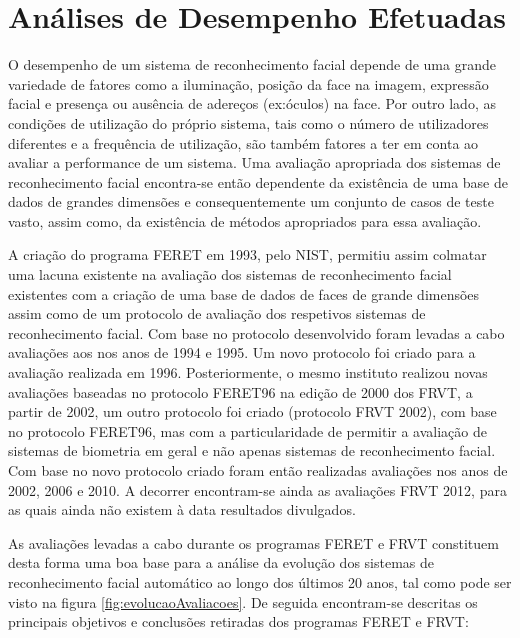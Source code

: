 

\section{Análises de Desempenho Efetuadas}\label{sec:performance}
O desempenho de um sistema de reconhecimento facial depende de uma grande variedade de fatores como a iluminação, posição da face na imagem, expressão facial e presença ou ausência de adereços (ex:óculos) na face. Por outro lado, as condições de utilização do próprio sistema, tais como o número de utilizadores diferentes e a frequência de utilização, são também fatores a ter em conta ao avaliar a performance de um sistema. Uma avaliação apropriada dos sistemas de reconhecimento facial encontra-se então dependente da existência de uma base de dados de grandes dimensões e consequentemente um conjunto de casos de teste vasto, assim como, da existência de métodos apropriados para essa avaliação.

A criação do programa FERET em 1993, pelo NIST, permitiu assim colmatar uma lacuna existente na avaliação dos sistemas de reconhecimento facial existentes com a criação de uma base de dados de faces de grande dimensões assim como de um protocolo de avaliação dos respetivos sistemas de reconhecimento facial. Com base no protocolo desenvolvido foram levadas a cabo avaliações aos nos anos de 1994 e 1995. Um novo protocolo foi criado para a avaliação realizada em 1996. Posteriormente, o mesmo instituto realizou novas avaliações baseadas no protocolo FERET96 na edição de 2000 dos FRVT, a partir de 2002, um outro protocolo foi criado (protocolo FRVT 2002), com base no protocolo FERET96, mas com a particularidade de permitir a avaliação de sistemas de biometria em geral e não apenas sistemas de reconhecimento facial. Com base no novo protocolo criado foram então realizadas avaliações nos anos de 2002, 2006 e 2010. A decorrer encontram-se ainda as avaliações FRVT 2012, para as quais ainda não existem à data resultados divulgados.

As avaliações levadas a cabo durante os programas FERET e FRVT constituem desta forma uma boa base para a análise da evolução dos sistemas de reconhecimento facial automático ao longo dos últimos 20 anos, tal como pode ser visto na figura \ref{fig:evolucaoAvaliacoes}. De seguida encontram-se descritas os principais objetivos e conclusões retiradas dos programas FERET e FRVT:

